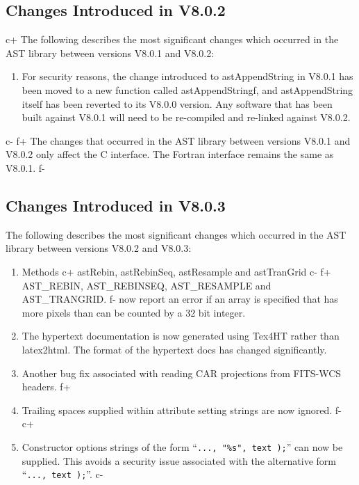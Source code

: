 \documentclass[twoside,11pt]{starlink}
\begin{document}
\subsection{Changes Introduced in V8.0.2}
c+
The following describes the most significant changes which
occurred in the AST library between versions V8.0.1 and V8.0.2:

\begin{enumerate}
\item For security reasons, the change introduced to astAppendString in
  V8.0.1 has been moved to a new function called astAppendStringf, and
  astAppendString itself has been reverted to its V8.0.0 version.
  Any software that has been built against V8.0.1 will need to be
  re-compiled and re-linked against V8.0.2.
\end{enumerate}

c-
f+
The changes that occurred in the AST library between versions V8.0.1 and
V8.0.2 only affect the C interface. The Fortran interface remains the
same as V8.0.1.
f-

\subsection{Changes Introduced in V8.0.3}
The following describes the most significant changes which
occurred in the AST library between versions V8.0.2 and V8.0.3:

\begin{enumerate}

\item Methods
c+
astRebin, astRebinSeq, astResample and astTranGrid
c-
f+
AST\_REBIN, AST\_REBINSEQ, AST\_RESAMPLE and AST\_TRANGRID.
f-
now report an error if an array is specified that has more pixels than
can be counted by a 32 bit integer.
\item The hypertext documentation is now generated using Tex4HT rather
than latex2html. The format of the hypertext docs has changed significantly.
\item Another bug fix associated with reading CAR projections from
FITS-WCS headers.
f+
\item Trailing spaces supplied within attribute setting strings are now ignored.
f-
c+
\item Constructor options strings of the form ``\texttt{..., "\%s", text );}''
can now be supplied. This avoids a security issue associated with the
alternative form ``\texttt{..., text );}''.
c-
\end{enumerate}
\end{document}
